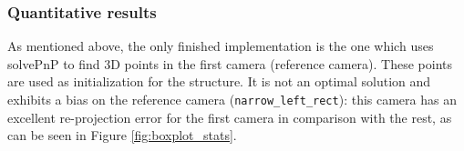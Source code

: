 \subsubsection{Quantitative results}

As mentioned above, the only finished implementation is the one which uses solvePnP to find 3D points in the first camera (reference camera). These points are used as initialization for the structure. It is not an optimal solution and exhibits a bias on the reference camera (\texttt{narrow\_left\_rect}): this camera has an excellent re-projection error for the first camera in comparison with the rest, as can be seen in Figure \ref{fig:boxplot_stats}.

